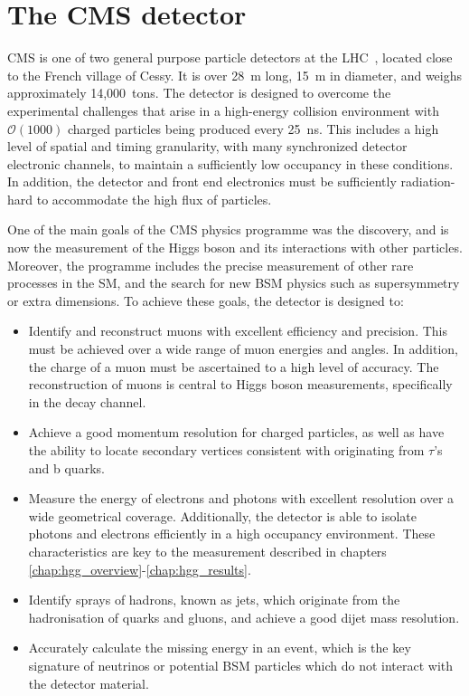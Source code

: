 \section{The CMS detector}\label{sec:cms}
CMS is one of two general purpose particle detectors at the LHC~\cite{Chatrchyan:2008zzk}, located close to the French village of Cessy. It is over 28~m long, 15~m in diameter, and weighs approximately 14,000~tons. The detector is designed to overcome the experimental challenges that arise in a high-energy collision environment with $\mathcal{O}(1000)$ charged particles being produced every 25~ns. This includes a high level of spatial and timing granularity, with many synchronized detector electronic channels, to maintain a sufficiently low occupancy in these conditions. In addition, the detector and front end electronics must be sufficiently radiation-hard to accommodate the high flux of particles.

One of the main goals of the CMS physics programme was the discovery, and is now the measurement of the Higgs boson and its interactions with other particles. Moreover, the programme includes the precise measurement of other rare processes in the SM, and the search for new BSM physics such as supersymmetry or extra dimensions. To achieve these goals, the detector is designed to:

\begin{itemize}
    \item Identify and reconstruct muons with excellent efficiency and precision. This must be achieved over a wide range of muon energies and angles. In addition, the charge of a muon must be ascertained to a high level of accuracy. The reconstruction of muons is central to Higgs boson measurements, specifically in the \Hfl decay channel.
    \item Achieve a good momentum resolution for charged particles, as well as have the ability to locate secondary vertices consistent with originating from $\tau$'s and b quarks.
    \item Measure the energy of electrons and photons with excellent resolution over a wide geometrical coverage. Additionally, the detector is able to isolate photons and electrons efficiently in a high occupancy environment. These characteristics are key to the \Hgg measurement described in chapters \ref{chap:hgg_overview}-\ref{chap:hgg_results}.
    \item Identify sprays of hadrons, known as jets, which originate from the hadronisation of quarks and gluons, and achieve a good dijet mass resolution.
    \item Accurately calculate the missing energy in an event, which is the key signature of neutrinos or potential BSM particles which do not interact with the detector material.
\end{itemize}

